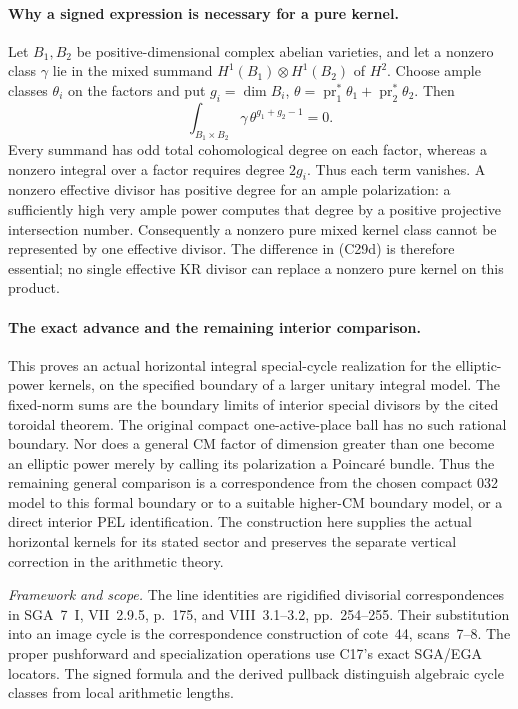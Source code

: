 \documentclass[11pt]{article}
\newcommand{\framework}[1]{\par\smallskip\noindent\textit{Framework and scope.} #1\par}
\theoremstyle{definition}\newtheorem{definition}[theorem]{Definition}\newtheorem{remark}[theorem]{Remark}
\begin{document}
\paragraph{Why a signed expression is necessary for a pure kernel.}
Let $B_1,B_2$ be positive-dimensional complex abelian
varieties, and let a nonzero class $\gamma$ lie in the
mixed summand $H^1(B_1)\otimes H^1(B_2)$ of $H^2$.
Choose ample classes $\theta_i$ on the factors and put
$g_i=\dim B_i$, $\theta=\operatorname{pr}_1^*\theta_1+
\operatorname{pr}_2^*\theta_2$. Then
\[
       \int_{B_1\times B_2}\gamma\,\theta^{g_1+g_2-1}=0.
 \tag{C29f}
\]
Every summand has odd total cohomological degree on
each factor, whereas a nonzero integral over a factor
requires degree $2g_i$. Thus each term vanishes.
A nonzero effective divisor has positive degree for
an ample polarization: a sufficiently high very ample
power computes that degree by a positive projective
intersection number. Consequently a nonzero pure
mixed kernel class cannot be represented by one
effective divisor. The difference in (C29d) is
therefore essential; no single effective KR divisor
can replace a nonzero pure kernel on this product.

\paragraph{The exact advance and the remaining interior comparison.}
This proves an actual horizontal integral special-cycle
realization for the elliptic-power kernels, on the
specified boundary of a larger unitary integral model.
The fixed-norm sums are the boundary limits of
interior special divisors by the cited toroidal theorem.
The original compact one-active-place ball has no such
rational boundary. Nor does a general CM factor of
dimension greater than one become an elliptic power
merely by calling its polarization a Poincar\'e bundle.
Thus the remaining general comparison is a
correspondence from the chosen compact 032 model to
this formal boundary or to a suitable higher-CM
boundary model, or a direct interior PEL identification.
The construction here supplies the actual horizontal
kernels for its stated sector and preserves the
separate vertical correction in the arithmetic theory.

\framework{The line identities are rigidified divisorial
correspondences in SGA~7~I, VII~2.9.5, p.~175, and
VIII~3.1--3.2, pp.~254--255. Their substitution into
an image cycle is the correspondence construction of
cote~44, scans~7--8. The proper pushforward and
specialization operations use C17's exact SGA/EGA
locators. The signed formula and the derived
pullback distinguish algebraic cycle classes from
local arithmetic lengths.}
\end{document}
